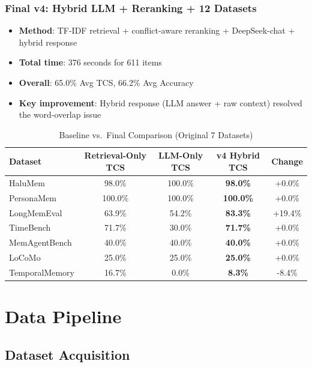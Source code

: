 \documentclass[11pt,a4paper]{article}
\begin{document}
\subsubsection{Final v4: Hybrid LLM + Reranking + 12 Datasets}
\begin{itemize}
    \item \textbf{Method}: TF-IDF retrieval + conflict-aware reranking + DeepSeek-chat + hybrid response
    \item \textbf{Total time}: 376 seconds for 611 items
    \item \textbf{Overall}: 65.0\% Avg TCS, 66.2\% Avg Accuracy
    \item \textbf{Key improvement}: Hybrid response (LLM answer + raw context) resolved the word-overlap issue
\end{itemize}

\begin{table}[H]
\centering
\caption{Baseline vs.\ Final Comparison (Original 7 Datasets)}
\small
\begin{tabular}{@{}lcccc@{}}
\toprule
\textbf{Dataset} & \textbf{Retrieval-Only TCS} & \textbf{LLM-Only TCS} & \textbf{v4 Hybrid TCS} & \textbf{Change} \\
\midrule
HaluMem        & 98.0\% & 100.0\% & \textbf{98.0\%} & +0.0\% \\
PersonaMem     & 100.0\% & 100.0\% & \textbf{100.0\%} & +0.0\% \\
LongMemEval    & 63.9\% & 54.2\% & \textbf{83.3\%} & \textcolor{green!60!black}{+19.4\%} \\
TimeBench      & 71.7\% & 30.0\% & \textbf{71.7\%} & +0.0\% \\
MemAgentBench  & 40.0\% & 40.0\% & \textbf{40.0\%} & +0.0\% \\
LoCoMo         & 25.0\% & 25.0\% & \textbf{25.0\%} & +0.0\% \\
TemporalMemory & 16.7\% & 0.0\%  & \textbf{8.3\%}  & -8.4\% \\
\bottomrule
\end{tabular}
\end{table}

\section{Data Pipeline}

\subsection{Dataset Acquisition}
\end{document}
